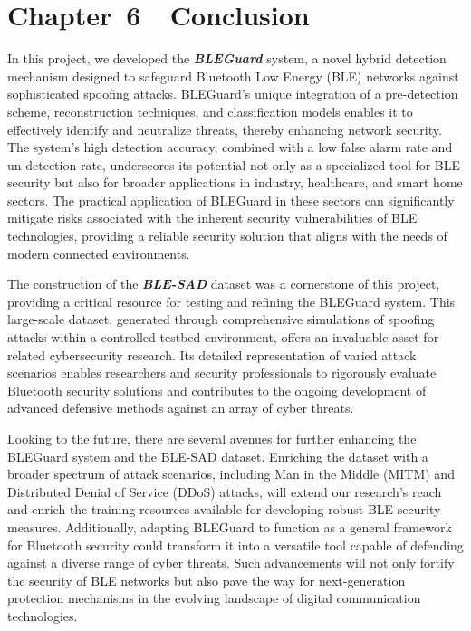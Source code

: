\section*{Chapter~6~~Conclusion}
\setcounter{section}{6} \setcounter{subsection}{0} 
\setcounter{table}{0} \setcounter{figure}{0} \setcounter{equation}{0}\setcounter{definition}{0}

\vspace{4pt}

\noindent In this project, we developed the \textit{\textbf{BLEGuard}} system, a novel hybrid detection mechanism designed to safeguard Bluetooth Low Energy (BLE) networks against sophisticated spoofing attacks. BLEGuard's unique integration of a pre-detection scheme, reconstruction techniques, and classification models enables it to effectively identify and neutralize threats, thereby enhancing network security. The system's high detection accuracy, combined with a low false alarm rate and un-detection rate, underscores its potential not only as a specialized tool for BLE security but also for broader applications in industry, healthcare, and smart home sectors. The practical application of BLEGuard in these sectors can significantly mitigate risks associated with the inherent security vulnerabilities of BLE technologies, providing a reliable security solution that aligns with the needs of modern connected environments.

\vspace{12pt}

The construction of the \textit{\textbf{BLE-SAD}} dataset was a cornerstone of this project, providing a critical resource for testing and refining the BLEGuard system. This large-scale dataset, generated through comprehensive simulations of spoofing attacks within a controlled testbed environment, offers an invaluable asset for related cybersecurity research. Its detailed representation of varied attack scenarios enables researchers and security professionals to rigorously evaluate Bluetooth security solutions and contributes to the ongoing development of advanced defensive methods against an array of cyber threats.

\vspace{12pt}

Looking to the future, there are several avenues for further enhancing the BLEGuard system and the BLE-SAD dataset. Enriching the dataset with a broader spectrum of attack scenarios, including Man in the Middle (MITM) and Distributed Denial of Service (DDoS) attacks, will extend our research's reach and enrich the training resources available for developing robust BLE security measures. Additionally, adapting BLEGuard to function as a general framework for Bluetooth security could transform it into a versatile tool capable of defending against a diverse range of cyber threats. Such advancements will not only fortify the security of BLE networks but also pave the way for next-generation protection mechanisms in the evolving landscape of digital communication technologies.

\newpage
